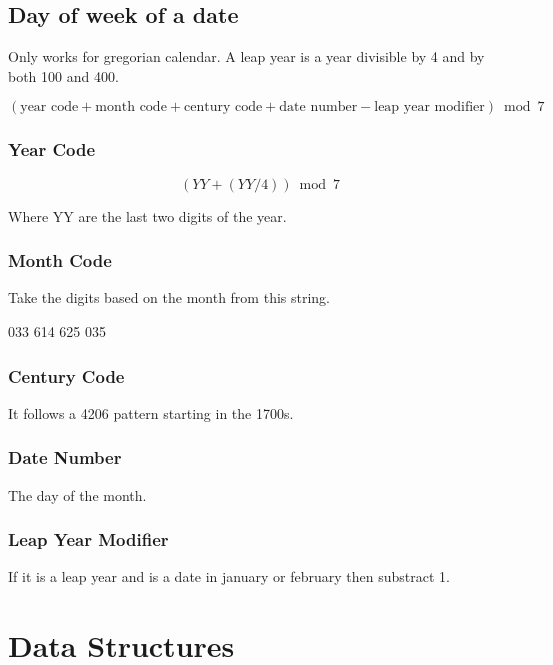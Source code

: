 \documentclass[10pt]{article}
\begin{document}
\subsection{Day of week of a date}

Only works for gregorian calendar. A leap year is a year divisible by 4 and by both 100 and 400.

\begin{displaymath}
(\text{year code} + \text{month code} + \text{century code} + \text{date number} - \text{leap year modifier}) \bmod 7
\end{displaymath}

\subsubsection{Year Code}

\begin{displaymath}
(YY + (YY / 4)) \bmod 7
\end{displaymath}

Where YY are the last two digits of the year.

\subsubsection{Month Code}

Take the digits based on the month from this string.

033 614 625 035

\subsubsection{Century Code}

It follows a 4206 pattern starting in the 1700s.

\subsubsection{Date Number}

The day of the month.

\subsubsection{Leap Year Modifier}

If it is a leap year and is a date in january or february then substract 1.

\section{Data Structures}
\end{document}
